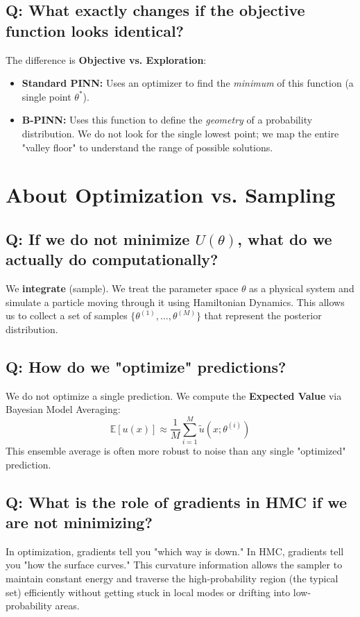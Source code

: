 \documentclass[11pt, a4paper]{article}
\begin{document}
\subsection*{Q: What exactly changes if the objective function looks identical?}
The difference is \textbf{Objective vs. Exploration}:
\begin{itemize}
    \item \textbf{Standard PINN:} Uses an optimizer to find the \textit{minimum} of this function (a single point $\theta^*$).
    \item \textbf{B-PINN:} Uses this function to define the \textit{geometry} of a probability distribution. We do not look for the single lowest point; we map the entire "valley floor" to understand the range of possible solutions.
\end{itemize}

\section{About Optimization vs. Sampling}

\subsection*{Q: If we do not minimize $U(\theta)$, what do we actually do computationally?}
We \textbf{integrate} (sample). We treat the parameter space $\theta$ as a physical system and simulate a particle moving through it using Hamiltonian Dynamics. This allows us to collect a set of samples $\{\theta^{(1)}, \dots, \theta^{(M)}\}$ that represent the posterior distribution.

\subsection*{Q: How do we "optimize" predictions?}
We do not optimize a single prediction. We compute the \textbf{Expected Value} via Bayesian Model Averaging:
\[
\mathbb{E}[u(x)] \approx \frac{1}{M} \sum_{i=1}^M \tilde{u}(x; \theta^{(i)})
\]
This ensemble average is often more robust to noise than any single "optimized" prediction.

\subsection*{Q: What is the role of gradients in HMC if we are not minimizing?}
In optimization, gradients tell you "which way is down." In HMC, gradients tell you "how the surface curves." This curvature information allows the sampler to maintain constant energy and traverse the high-probability region (the typical set) efficiently without getting stuck in local modes or drifting into low-probability areas.
\end{document}
